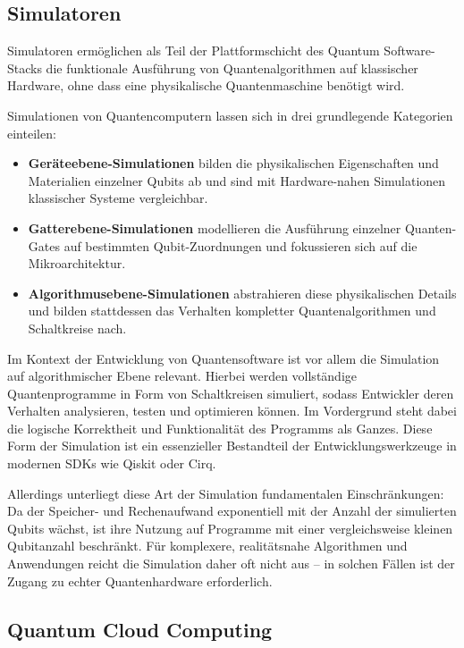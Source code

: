 \subsection{Simulatoren}

Simulatoren ermöglichen als Teil der Plattformschicht des Quantum Software-Stacks die funktionale Ausführung von Quantenalgorithmen auf klassischer Hardware, ohne dass eine physikalische Quantenmaschine benötigt wird.

Simulationen von Quantencomputern lassen sich in drei grundlegende Kategorien einteilen:
\begin{itemize}
\item \textbf{Geräteebene-Simulationen} bilden die physikalischen Eigenschaften und Materialien einzelner Qubits ab und sind mit Hardware-nahen Simulationen klassischer Systeme vergleichbar.
\item \textbf{Gatterebene-Simulationen} modellieren die Ausführung einzelner Quanten-Gates auf bestimmten Qubit-Zuordnungen und fokussieren sich auf die Mikroarchitektur.
\item \textbf{Algorithmusebene-Simulationen} abstrahieren diese physikalischen Details und bilden stattdessen das Verhalten kompletter Quantenalgorithmen und Schaltkreise nach.
\end{itemize}

Im Kontext der Entwicklung von Quantensoftware ist vor allem die Simulation auf algorithmischer Ebene relevant. Hierbei werden vollständige Quantenprogramme in Form von Schaltkreisen simuliert, sodass Entwickler deren Verhalten analysieren, testen und optimieren können. Im Vordergrund steht dabei die logische Korrektheit und Funktionalität des Programms als Ganzes. Diese Form der Simulation ist ein essenzieller Bestandteil der Entwicklungswerkzeuge in modernen SDKs wie Qiskit oder Cirq.

Allerdings unterliegt diese Art der Simulation fundamentalen Einschränkungen: Da der Speicher- und Rechenaufwand exponentiell mit der Anzahl der simulierten Qubits wächst, ist ihre Nutzung auf Programme mit einer vergleichsweise kleinen Qubitanzahl beschränkt. Für komplexere, realitätsnahe Algorithmen und Anwendungen reicht die Simulation daher oft nicht aus -- in solchen Fällen ist der Zugang zu echter Quantenhardware erforderlich. \autocite{TODO:Simulation of Quantum Computers: Review and Acceleration
Opportunities}

\subsection{Quantum Cloud Computing}

